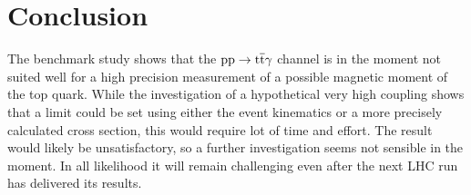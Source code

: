 \section{Conclusion}

The benchmark study shows that the $\mathrm{pp} \to \mathrm{t}\overline{\mathrm{t}} \gamma$ channel is in the moment not suited well for a high precision measurement of a possible magnetic moment of the top quark. While the investigation of a hypothetical very high coupling shows that a limit could be set using either the event kinematics or a more precisely calculated cross section, this would require lot of time and effort. The result would likely be unsatisfactory, so a further investigation seems not sensible in the moment. In all likelihood it will remain challenging even after the next LHC run has delivered its results. 